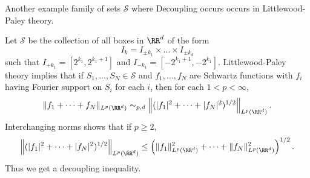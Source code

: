 Another example family of sets $\mathcal{S}$ where Decoupling occurs occurs in Littlewood-Paley theory.

\begin{theorem}
  Let $\mathcal{S}$ be the collection of all boxes in $\RR^d$ of the form
  \[ I_k = I_{\pm k_1} \times \dots \times I_{\pm k_d} \]
  such that $I_{+ k_1} = [2^{k_1}, 2^{k_1 + 1}]$ and $I_{-k_1} = [-2^{k_1+1}, -2^{k_1}]$. Littlewood-Paley theory implies that if $S_1, \dots, S_N \in \mathcal{S}$ and $f_1, \dots, f_N$ are Schwartz functions with $f_i$ having Fourier support on $S_i$ for each $i$, then for each $1 < p < \infty$,
  \[ \| f_1 + \dots + f_N \|_{L^p(\RR^d)} \sim_{p,d} \left\|(|f_1|^2 + \dots + |f_N|^2)^{1/2} \right\|_{L^p(\RR^d)}. \]
  Interchanging norms shows that if $p \geq 2$,
  \[ \left\|(|f_1|^2 + \dots + |f_N|^2)^{1/2} \right\|_{L^p(\RR^d)} \leq \left( \| f_1 \|_{L^p(\RR^d)}^2 + \dots + \| f_N \|_{L^p(\RR^d)}^2 \right)^{1/2}. \]
  Thus we get a decoupling inequality.
\end{theorem}



\begin{comment}
\begin{example}
  TODO: Move this. When $p < 2$, one does not usually expect to find decoupling inequalities in $L^p(\Omega)$. For instance, for any family of disjoint measurable sets $E_1, \dots, E_N \in \Omega$, each with non-negative measure, one can find $f_1, \dots, f_N \in L^p(\Omega)$, with $f_i$ supported on $E_i$ for each $i$ such that
  \begin{align*}
    \| f_1 + \dots + f_N \|_{L^p(\Omega)} &= \left( \| f_1 \|_{L^p(\Omega)}^p + \dots + \| f_N \|_{L^p(\Omega)}^p \right)^{1/p}\\
    &\geq N^{1/p - 1/2} \left( \| f_1 \|_{L^p(\Omega)}^2 + \dots + \| f_N \|_{L^p(\Omega)}^2 \right)^{1/2}.
  \end{align*}
  The idea of this is simple; we just choose a family of scalars $A_1, \dots, A_N$ such that
  \[ (A_1^p + \dots + A_N^p)^{1/p} = N^{1/p - 1/2} (A_1^2 + \dots + A_N^2)^{1/2}. \]
  Given functions $f_1, \dots, f_N$ such that $f_i$ is supported in $E_i$ for each $i$, we need only rescale each function such that $\| f_i \|_{L^p(\Omega)} = A_i$ for each $i$. Similarily, if $U_1, \dots, U_N$ are disjoint open sets in $\RR^d$, we can find Schwartz functions $f_1, \dots, f_N$, such that $f_i$ has Fourier support in $U_i$ for each $i$, such that
  \[ \| f_1 + \dots + f_N \|_{L^p(\Omega)} \gtrsim N^{1/p - 1/2} \left( \| f_1 \|_{L^p(\Omega)}^2 + \dots + \| f_N \|_{L^p(\Omega)}^2 \right)^{1/2}, \]
  where the implict constant is independant of $N$, and $U_1, \dots, U_N$. The idea here is to begin with Schwarz functions $f_1, \dots, f_N$ such that $f_i$ has Fourier suppport in $U_i$, and then replace these Schwarz functions with translations such that the masses of the $f_i$ are essentially disjoint from one another, which only modulates the Fourier transform and so does not affect the Fourier support of the functions. Rescaling then gives the result.
\end{example}
\end{comment}

